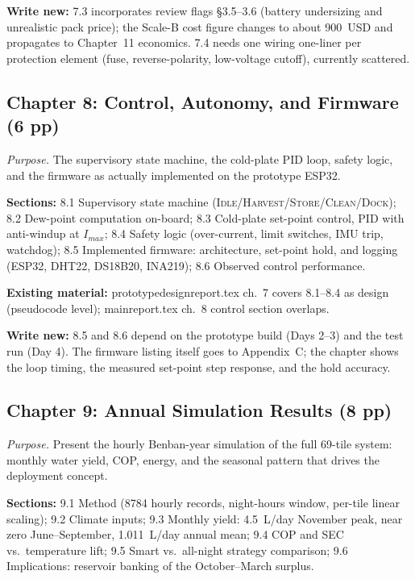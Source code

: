 \documentclass[11pt,a4paper]{article}
\newcommand{\f}[1]{{\ttfamily\def\_{\textunderscore\allowbreak}#1}}
\begin{document}
\textbf{Write new:} 7.3 incorporates review flags \S3.5--3.6 (battery
undersizing and unrealistic pack price); the Scale-B cost figure changes to
about 900~USD and propagates to Chapter~11 economics. 7.4 needs one wiring
one-liner per protection element (fuse, reverse-polarity, low-voltage cutoff),
currently scattered.

\subsection{Chapter 8: Control, Autonomy, and Firmware (6 pp)}
\textit{Purpose.} The supervisory state machine, the cold-plate PID loop, safety
logic, and the firmware as actually implemented on the prototype ESP32.

\textbf{Sections:} 8.1 Supervisory state machine
(\textsc{Idle}/\textsc{Harvest}/\textsc{Store}/\textsc{Clean}/\textsc{Dock});
8.2 Dew-point computation on-board; 8.3 Cold-plate set-point control, PID with
anti-windup at $I_{max}$; 8.4 Safety logic (over-current, limit switches, IMU
trip, watchdog); 8.5 Implemented firmware: architecture, set-point hold, and
logging (ESP32, DHT22, DS18B20, INA219); 8.6 Observed control performance.

\textbf{Existing material:} \f{prototype\_design\_report.tex} ch.~7 covers
8.1--8.4 as design (pseudocode level); \f{main\_report.tex} ch.~8 control
section overlaps.

\textbf{Write new:} 8.5 and 8.6 depend on the prototype build (Days 2--3) and
the test run (Day 4). The firmware listing itself goes to Appendix~C; the
chapter shows the loop timing, the measured set-point step response, and the
hold accuracy.

\subsection{Chapter 9: Annual Simulation Results (8 pp)}
\textit{Purpose.} Present the hourly Benban-year simulation of the full 69-tile
system: monthly water yield, COP, energy, and the seasonal pattern that drives
the deployment concept.

\textbf{Sections:} 9.1 Method (8784 hourly records, night-hours window,
per-tile linear scaling); 9.2 Climate inputs; 9.3 Monthly yield: 4.5~L/day
November peak, near zero June--September, 1.011~L/day annual mean; 9.4 COP and
SEC vs.\ temperature lift; 9.5 Smart vs.\ all-night strategy comparison; 9.6
Implications: reservoir banking of the October--March surplus.
\end{document}
